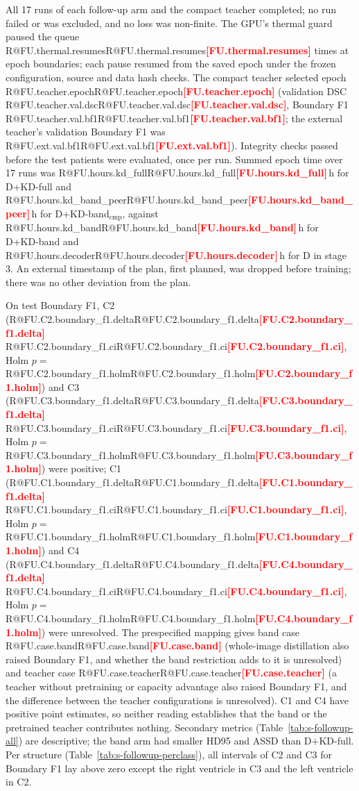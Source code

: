 \documentclass[10pt]{article}
\makeatletter
\newcommand{\R}[1]{\ifcsname R@#1\endcsname\csname R@#1\endcsname\else\textbf{\textcolor{red}{[#1]}}\fi}
\renewcommand\paragraph{\@startsection{paragraph}{4}{\z@}{1.6ex \@plus .5ex \@minus .2ex}{-1em}{\normalfont\normalsize\bfseries}}
\makeatother
\begin{document}
\paragraph{Runs.} All 17 runs of each follow-up arm and the compact teacher completed; no run failed or was excluded, and no loss was non-finite. The GPU's thermal guard paused the queue \R{FU.thermal.resumes} times at epoch boundaries; each pause resumed from the saved epoch under the frozen configuration, source and data hash checks. The compact teacher selected epoch \R{FU.teacher.epoch} (validation DSC \R{FU.teacher.val.dsc}, Boundary F1 \R{FU.teacher.val.bf1}; the external teacher's validation Boundary F1 was \R{FU.ext.val.bf1}). Integrity checks passed before the test patients were evaluated, once per run. Summed epoch time over 17 runs was \R{FU.hours.kd_full}\,h for D+KD-full and \R{FU.hours.kd_band_peer}\,h for D+KD-band$_{\mathrm{cmp}}$, against \R{FU.hours.kd_band}\,h for D+KD-band and \R{FU.hours.decoder}\,h for D in stage 3. An external timestamp of the plan, first planned, was dropped before training; there was no other deviation from the plan.

\paragraph{Results.} On test Boundary F1, C2 (\R{FU.C2.boundary_f1.delta} \R{FU.C2.boundary_f1.ci}, Holm $p=$\,\R{FU.C2.boundary_f1.holm}) and C3 (\R{FU.C3.boundary_f1.delta} \R{FU.C3.boundary_f1.ci}, Holm $p=$\,\R{FU.C3.boundary_f1.holm}) were positive; C1 (\R{FU.C1.boundary_f1.delta} \R{FU.C1.boundary_f1.ci}, Holm $p=$\,\R{FU.C1.boundary_f1.holm}) and C4 (\R{FU.C4.boundary_f1.delta} \R{FU.C4.boundary_f1.ci}, Holm $p=$\,\R{FU.C4.boundary_f1.holm}) were unresolved. The prespecified mapping gives band case \R{FU.case.band} (whole-image distillation also raised Boundary F1, and whether the band restriction adds to it is unresolved) and teacher case \R{FU.case.teacher} (a teacher without pretraining or capacity advantage also raised Boundary F1, and the difference between the teacher configurations is unresolved). C1 and C4 have positive point estimates, so neither reading establishes that the band or the pretrained teacher contributes nothing. Secondary metrics (Table~\ref{tab:s-followup-all}) are descriptive; the band arm had smaller HD95 and ASSD than D+KD-full. Per structure (Table~\ref{tab:s-followup-perclass}), all intervals of C2 and C3 for Boundary F1 lay above zero except the right ventricle in C3 and the left ventricle in C2.
\end{document}
